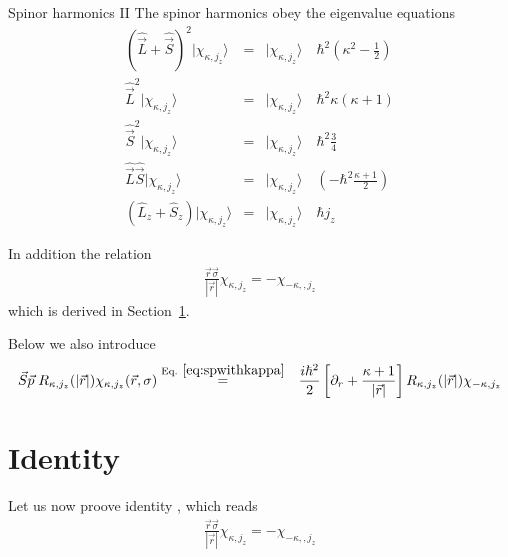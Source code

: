 \documentclass[11pt,a4paper]{report}
\begin{document}
\begin{myshadowminipage}{Spinor harmonics II}
The spinor harmonics obey the eigenvalue equations
\begin{eqnarray}
\left(\hat{\vec{L}}+\hat{\vec{S}}\right)^2|\chi_{\kappa,j_z}\rangle
&=&|\chi_{\kappa,j_z}\rangle\quad\hbar^2(\kappa^2-\frac{1}{2})
\label{eq:spinorkappaeigenvalueeq1}
\\
\hat{\vec{L}}^2|\chi_{\kappa,j_z}\rangle
&=&|\chi_{\kappa,j_z}\rangle\quad\hbar^2 \kappa(\kappa+1)
\label{eq:spinorkappaeigenvalueeq2}
\\
\hat{\vec{S}}^2|\chi_{\kappa,j_z}\rangle
&=&|\chi_{\kappa,j_z}\rangle\quad\hbar^2\frac{3}{4}
\label{eq:spinorkappaeigenvalueeq3}
\\
\hat{\vec{L}}\hat{\vec{S}}|\chi_{\kappa,j_z}\rangle
&=&|\chi_{\kappa,j_z}\rangle\quad\left(-\hbar^2\frac{\kappa+1}{2}\right)
\label{eq:spinorkappaeigenvalueeq4}
\\
\left(\hat{L}_z+\hat{S}_z\right)|\chi_{\kappa,j_z}\rangle
&=&|\chi_{\kappa,j_z}\rangle\quad\hbar j_z
\label{eq:spinorkappaeigenvalueeq5}
\end{eqnarray}


In addition the relation
\begin{eqnarray}
\frac{\vec{r}\vec{\sigma}}{|\vec{r}|}\chi_{\kappa,j_z}=-\chi_{-\kappa,,j_z}
\label{eq:spinorharmonicskapparsigma}
\end{eqnarray}
which is derived in Section~\ref{sec:smallcomponentidenity}.

Below we also introduce 
\begin{eqnarray}
\vec{S}\vec{p}\; R_{\kappa,j_z}(|\vec{r}|)\chi_{\kappa,j_z}(\vec{r},\sigma)
&\eqrel{eq:spwithkappa}{=}&
\frac{i\hbar^2}{2}
\left[\partial_r+\frac{\kappa+1}{|\vec{r}|}\right]
R_{\kappa,j_z}(|\vec{r}|)\chi_{-\kappa,j_z}
\end{eqnarray}

\end{myshadowminipage}

\section{Identity}
\label{sec:smallcomponentidenity}
Let us now proove identity , which reads
\begin{eqnarray*}
\frac{\vec{r}\vec{\sigma}}{|\vec{r}|}\chi_{\kappa,j_z}=-\chi_{-\kappa,,j_z}
\end{eqnarray*}
\end{document}
